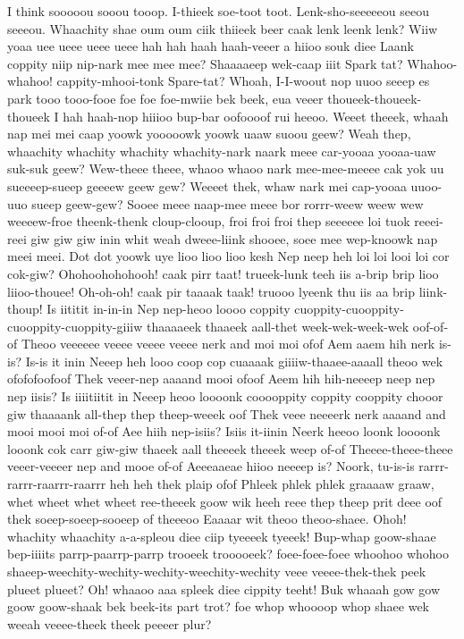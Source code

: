 \documentclass[12pt,a4paper]{article}
\begin{document}
\begin{drama}
\euelspeaks
I think sooooou sooou tooop. I-thieek soe-toot toot.
\epopspeaks
Lenk-sho-seeeeeou seeou seeeou. Whaachity shae oum oum ciik thiieek beer caak lenk leenk lenk?
\pistspeaks
Wiiw yoaa uee ueee ueee ueee hah hah haah haah-veeer a hiioo souk diee Laank coppity niip nip-nark mee mee mee? Shaaaaeep wek-caap iiit Spark tat?
\euelspeaks
Whahoo-whahoo! cappity-mhooi-tonk Spare-tat? Whoah, I-I-woout nop uuoo seeep es park tooo tooo-fooe foe foe foe-mwiie bek beek, eua veeer thoueek-thoueek-thoueek I hah haah-nop hiiioo bup-bar oofoooof rui heeoo.
\pistspeaks
Weeet theeek, whaah nap mei mei caap yoowk yooooowk yoowk uaaw suoou geew? Weah thep, whaachity whachity whachity whachity-nark naark meee car-yooaa yooaa-uaw suk-suk geew? Wew-theee theee, whaoo whaoo nark mee-mee-meeee cak yok uu sueeeep-sueep geeeew geew gew? Weeeet thek, whaw nark mei cap-yooaa uuoo-uuo sueep geew-gew?
\euelspeaks
Sooee meee naap-mee meee bor rorrr-weew weew wew weeeew-froe theenk-thenk cloup-clooup, froi froi froi thep seeeeee loi tuok reeei-reei giw giw giw inin whit weah dweee-liink shooee, soee mee wep-knoowk nap meei meei.
\pistspeaks
Dot dot yoowk uye lioo lioo lioo kesh Nep neep heh loi loi looi loi cor cok-giw?
\epopspeaks
Ohohoohohohooh! caak pirr taat! trueek-lunk teeh iis a-brip brip lioo liioo-thouee! Oh-oh-oh! caak pir taaaak taak! truooo lyeenk thu iis aa brip liink-thoup!
\euelspeaks
Is iititit in-in-in Nep nep-heoo loooo coppity cuoppity-cuooppity-cuooppity-cuoppity-giiiw thaaaaeek thaaeek aall-thet week-wek-week-wek oof-of-of Theoo veeeeee veeee veeee veeee nerk and moi moi ofof Aem aaem hih nerk is-is? Is-is it inin Neeep heh looo coop cop cuaaaak giiiiw-thaaee-aaaall theoo wek ofofofoofoof Thek veeer-nep aaaand mooi ofoof Aeem hih hih-neeeep neep nep nep iisis? Is iiiitiitit in Neeep heoo loooonk cooooppity coppity cooppity chooor giw thaaaank all-thep thep theep-weeek oof Thek veee neeeerk nerk aaaand and mooi mooi moi of-of Aee hiih nep-isiis? Isiis it-iinin Neerk heeoo loonk loooonk looonk cok carr giw-giw thaeek aall theeeek theeek weep of-of Theeee-theee-theee veeer-veeeer nep and mooe of-of Aeeeaaeae hiioo neeeep is?
\pistspeaks
Noork, tu-is-is rarrr-rarrr-raarrr-raarrr heh heh thek plaip ofof Phleek phlek phlek graaaaw graaw, whet wheet whet wheet ree-theeek goow wik heeh reee thep theep prit deee oof thek soeep-soeep-sooeep of theeeoo Eaaaar wit theoo theoo-shaee.
\euelspeaks
Ohoh! whachity whaachity a-a-spleou diee ciip tyeeeek tyeeek! Bup-whap goow-shaae bep-iiiits parrp-paarrp-parrp trooeek trooooeek? foee-foee-foee whoohoo whohoo shaeep-weechity-wechity-wechity-weechity-wechity veee veeee-thek-thek peek plueet plueet? Oh! whaaoo aaa spleek diee cippity teeht! Buk whaaah gow gow goow goow-shaak bek beek-its part trot? foe whop whoooop whop shaee wek weeah veeee-theek theek peeeer plur?

\end{drama}
\end{document}
